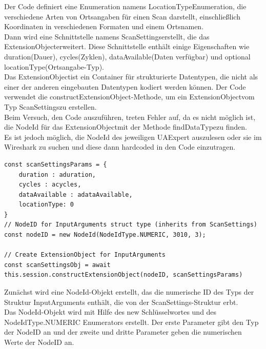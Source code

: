 Der Code definiert eine Enumeration namens \dq LocationTypeEnumeration\dq , die verschiedene Arten von Ortsangaben für einen Scan darstellt, einschließlich Koordinaten in verschiedenen Formaten und einem Ortsnamen.\\

Dann wird eine Schnittstelle namens \dq ScanSettings\dq  erstellt, die das \dq ExtensionObject\dq  erweitert. Diese Schnittstelle enthält einige Eigenschaften wie \dq duration\dq  (Dauer), \dq cycles\dq  (Zyklen), \dq dataAvailable\dq  (Daten verfügbar) und optional \dq locationType\dq  (Ortsangabe-Typ).\\

Das \dq ExtensionObject\dq  ist ein Container für strukturierte Datentypen, die nicht als einer der anderen eingebauten Datentypen kodiert werden können. Der Code verwendet die \dq constructExtensionObject\dq -Methode, um ein \dq ExtensionObject\dq  vom Typ \dq ScanSettings\dq  zu erstellen.\\

Beim Versuch, den Code auszuführen, treten Fehler auf, da es nicht möglich ist, die NodeId für das \dq ExtensionObject\dq  mit der Methode \dq findDataType\dq  zu finden.\\

Es ist jedoch möglich, die NodeId des jeweiligen UAExpert auszulesen oder sie im Wireshark zu suchen und diese dann hardcoded in den Code einzutragen.\\

\begin{lstlisting}[style=JavaScript, caption={ScanSettingsObj}]
const scanSettingsParams = {
    duration : aduration,
    cycles : acycles,
    dataAvailable : adataAvailable,
    locationType: 0
}
// NodeID for InputArguments struct type (inherits from ScanSettings)
const nodeID = new NodeId(NodeIdType.NUMERIC, 3010, 3);

// Create ExtensionObject for InputArguments
const scanSettingsObj = await this.session.constructExtensionObject(nodeID, scanSettingsParams)
\end{lstlisting}

Zunächst wird eine NodeId-Objekt erstellt, das die numerische ID des Typs der Struktur InputArguments enthält, die von der ScanSettings-Struktur erbt.\\

Das NodeId-Objekt wird mit Hilfe des new Schlüsselwortes und des NodeIdType.NUMERIC Enumerators erstellt. Der erste Parameter gibt den Typ der NodeID an und der zweite und dritte Parameter geben die numerischen Werte der NodeID an.\\

